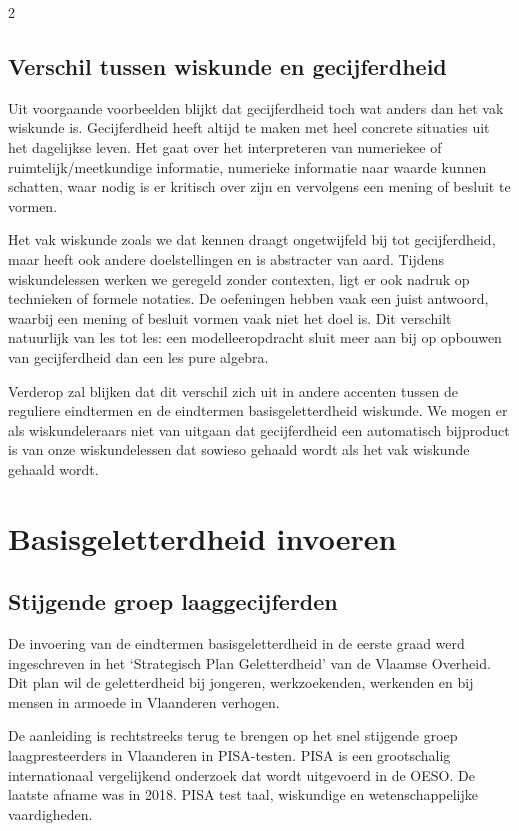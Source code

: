 \begin{multicols}{2}
\subsection{Verschil tussen wiskunde en gecijferdheid}
Uit voorgaande voorbeelden blijkt dat gecijferdheid toch wat anders dan het vak wiskunde is. Gecijferdheid heeft altijd te maken met heel concrete situaties uit het dagelijkse leven. Het gaat over het interpreteren van numeriekee of ruimtelijk/meetkundige informatie, numerieke informatie naar waarde kunnen schatten, waar nodig is er kritisch over zijn en vervolgens een mening of besluit te vormen. 

Het vak wiskunde zoals we dat kennen draagt ongetwijfeld bij tot gecijferdheid, maar heeft ook andere doelstellingen en is abstracter van aard. Tijdens wiskundelessen werken we geregeld zonder contexten, ligt er ook nadruk op technieken of formele notaties. De oefeningen hebben vaak een juist antwoord, waarbij een mening of besluit vormen vaak niet het doel is. Dit verschilt natuurlijk van les tot les: een modelleeropdracht sluit meer aan bij op opbouwen van gecijferdheid dan een les pure algebra. 

Verderop zal blijken dat dit verschil zich uit in andere accenten tussen de reguliere eindtermen en de eindtermen basisgeletterdheid wiskunde. We mogen er als wiskundeleraars niet van uitgaan dat gecijferdheid een automatisch bijproduct is van onze wiskundelessen dat sowieso gehaald wordt als het vak wiskunde gehaald wordt.


\section{Basisgeletterdheid invoeren}
\subsection*{Stijgende groep laaggecijferden}

De invoering van de eindtermen basisgeletterdheid in de eerste graad werd ingeschreven in het `Strategisch Plan Geletterdheid' van de Vlaamse Overheid. Dit plan wil de geletterdheid bij jongeren, werkzoekenden, werkenden en bij mensen in armoede in Vlaanderen verhogen. 

De aanleiding is rechtstreeks terug te brengen op het snel stijgende groep laagpresteerders in Vlaanderen in PISA-testen. PISA is een grootschalig internationaal vergelijkend onderzoek dat wordt uitgevoerd in de OESO. De laatste afname was in 2018. PISA test taal, wiskundige en wetenschappelijke vaardigheden. 


\end{multicols}
